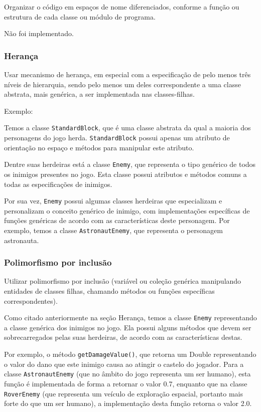 \documentclass[rel_mlp]{iiufrgs}
\begin{document}
Organizar o código em espaços de nome diferenciados, conforme a função ou estrutura de cada classe ou módulo de programa.

Não foi implementado.


\subsubsection{Herança}

Usar mecanismo de herança, em especial com a especificação de pelo menos três níveis de hierarquia, sendo pelo menos um deles correspondente a uma classe abstrata, mais genérica, a ser implementada nas classes-filhas.

Exemplo:

Temos a classe \texttt{StandardBlock}, que é uma classe abstrata da  qual a maioria dos personagens do jogo herda. \texttt{StandardBlock} possui apenas um atributo de orientação no espaço e métodos para manipular este atributo.

Dentre suas herdeiras está a classe \texttt{Enemy}, que representa o tipo genérico de todos os inimigos presentes no jogo. Esta classe possui atributos e métodos comuns a todas as especificações de inimigos.

Por sua vez, \texttt{Enemy} possui algumas classes herdeiras que especializam e personalizam o conceito genérico de inimigo, com implementações específicas de funções genéricas de acordo com as características deste personagem. Por exemplo, temos a classe \texttt{AstronautEnemy}, que representa o personagem astronauta.


\subsubsection{Polimorfismo por inclusão}

Utilizar polimorfismo por inclusão (variável ou coleção genérica manipulando entidades de classes filhas, chamando métodos ou funções específicas correspondentes).

Como citado anteriormente na seção Herança, temos a classe \texttt{Enemy} representando a classe genérica dos inimigos no jogo. Ela possui alguns métodos que devem ser sobrecarregados pelas suas herdeiras, de acordo com as características destas.

Por exemplo, o método \texttt{getDamageValue()}, que retorna um Double representando o valor do dano que este inimigo causa ao atingir o castelo do jogador. Para a classe \texttt{AstronautEnemy} (que no âmbito do jogo representa um ser humano), esta função é implementada de forma a retornar o valor 0.7, enquanto que na classe \texttt{RoverEnemy} (que representa um veículo de exploração espacial, portanto mais forte do que um ser humano), a implementação desta função retorna o valor 2.0.
\end{document}

